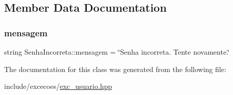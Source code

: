 \subsection{Member Data Documentation}
\mbox{\label{classSenhaIncorreta_a79a5b7430df661579c81fd1be29ff66f}} 
\subsubsection{\texorpdfstring{mensagem}{mensagem}}
{\footnotesize\ttfamily string Senha\+Incorreta\+::mensagem = \char`\"{}Senha incorreta. Tente novamente.\char`\"{}\hspace{0.3cm}{\ttfamily [private]}}



The documentation for this class was generated from the following file\+:\begin{DoxyCompactItemize}
\item 
include/excecoes/\hyperlink{exc__usuario_8hpp}{exc\+\_\+usuario.\+hpp}\end{DoxyCompactItemize}
